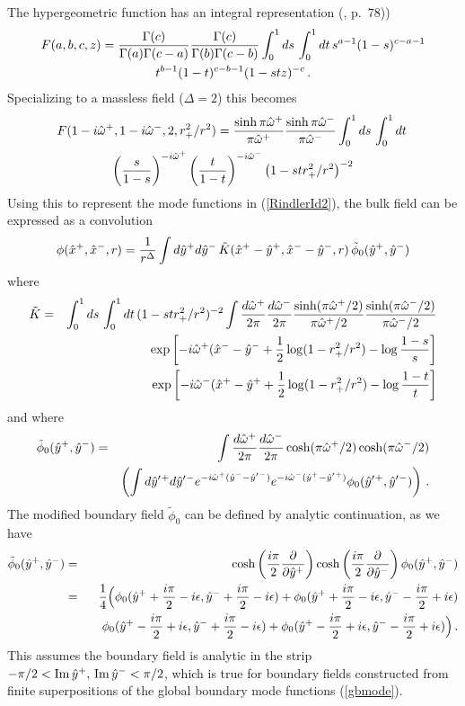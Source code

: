 \documentclass[12pt]{article}
\newcommand{\be}{\begin{equation}}
\newcommand{\ee}{\end{equation}}
\newcommand{\bea}{\begin{eqnarray}}
\newcommand{\eea}{\end{eqnarray}}
\newcommand{\beas}{\begin{eqnarray*}}
\newcommand{\eeas}{\end{eqnarray*}}
\newcommand{\hw}{\hat{\omega}}
\newcommand{\hx}{\hat{x}}
\newcommand{\hy}{\hat{y}}
\begin{document}
The hypergeometric function has an integral representation (\cite{Bateman}, p.~78))
\begin{multline*}
F(a,b,c,z) = {\Gamma(c) \over \Gamma(a) \Gamma(c - a)} {\Gamma(c) \over \Gamma(b) \Gamma(c - b)}
\int_0^1 ds \, \int_0^1 dt\, s^{a - 1} (1-s)^{c - a - 1} \\
t^{b - 1} (1 - t)^{c - b - 1} (1 - stz)^{-c}\,.
\end{multline*}
Specializing to a massless field ($\Delta = 2$) this becomes
%
\begin{multline*}
F(1 - i \hat{\omega}^+, 1 - i \hat{\omega}^-, 2, r_+^2 / r^2) = {\sinh \pi \hw^+ \over \pi \hw^+}
{\sinh \pi \hw^- \over \pi \hw^-} \int_0^1 ds \, \int_0^1 dt \, \\
 \left(s \over 1 - s \right)^{-i \hw^+} \left(t \over 1 - t \right)^{-i \hw^-} \left(1 - s t r_+^2 / r^2\right)^{-2}
\end{multline*}
%
Using this to represent the mode functions in (\ref{RindlerId2}), the bulk field can be expressed as a convolution
%
\be
\label{RindlerConvolution}
\phi(\hx^+,\hx^-,r) = {1 \over r^\Delta} \int d\hy^+ d\hy^- \, \tilde{K}(\hx^+ - \hy^+,\hx^- - \hy^-,r) \,
\tilde{\phi}_0(\hy^+,\hy^-)
\ee
%
where
%
\bea
\nonumber
\tilde{K} & = & \int_0^1 ds \, \int_0^1 dt \, (1 - s t r_+^2 / r^2)^{-2} \int {d\hw^+ \over 2 \pi} {d\hw^- \over 2 \pi}
{\sinh (\pi \hw^+ / 2) \over \pi \hw^+ / 2} {\sinh (\pi \hw^- / 2) \over \pi \hw^- / 2} \\
& & \exp\left[-i \hw^+ (\hx^- - \hy^- + {1 \over 2} \log(1 - r_+^2/r^2) - \log {1 - s \over s}\right] \\
\nonumber
& & \exp\left[-i \hw^- (\hx^+ - \hy^+ + {1 \over 2} \log(1 - r_+^2/r^2) - \log {1 - t \over t}\right]
\eea
%
and where
%
\bea
\tilde{\phi}_0(\hy^+,\hy^-) & = & \int {d\hw^+ \over 2\pi} {d\hw^- \over 2\pi} \cosh (\pi \hw^+ / 2) \cosh (\pi \hw^-/2) \\
\nonumber
& & \left(\int d\hy'{}^+ d\hy'{}^- e^{-i \hw^+ (\hy^- - \hy'{}^-)} e^{-i \hw^- (\hy^+ - \hy'{}^+)} \phi_0(\hy'{}^+,\hy'{}^-) \right)\,.
\eea
%
The modified boundary field $\tilde{\phi}_0$ can be defined by analytic continuation, as we have
%
\beas
\tilde{\phi}_0(\hy^+,\hy^-) & = & \cosh \left({i \pi \over 2} {\partial \over \partial \hy^+}\right)
\cosh \left({i \pi \over 2} {\partial \over \partial \hy^-}\right) \phi_0(\hy^+,\hy^-) \\
& = & {1 \over 4} \Bigl( \phi_0(\hy^+ + {i \pi \over 2} - i \epsilon, \hy^- + {i \pi \over 2} - i \epsilon) +
\phi_0(\hy^+ + {i \pi \over 2} - i \epsilon, \hy^- - {i \pi \over 2} + i \epsilon) \\
& & \quad \phi_0(\hy^+ - {i \pi \over 2} + i \epsilon, \hy^- + {i \pi \over 2} - i \epsilon) +
\phi_0(\hy^+ - {i \pi \over 2} + i \epsilon, \hy^- - {i \pi \over 2} + i \epsilon) \Bigr)\,.
\eeas
%
This assumes the boundary field is analytic in the strip $-\pi/2 <
{\rm Im} \, \hy^+,\, {\rm Im} \, \hy^- < \pi/2$, which is true for
boundary fields constructed from finite superpositions of the global
boundary mode functions (\ref{gbmode}).
\end{document}
